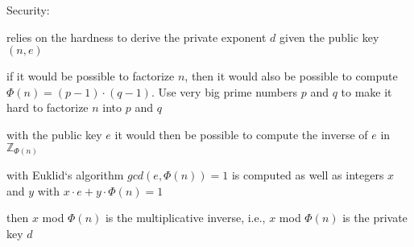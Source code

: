 \documentclass[landscape, a4paper]{article}
\begin{document}
\begin{minipage}[t]{0.198\pagewidth}
\begin{betterlist}
\begin{betterlist}
		\end{betterlist}
		\item \alert{Security:}
		\begin{betterlist}
			\item relies on the hardness to derive the \alert{private exponent} $d$ given the public key $(n, e)$
			\item if it would be possible to factorize $n$, then it would also be possible to compute $\Phi(n)= (p - 1) \cdot (q - 1)$. Use very big prime numbers $p$ and $q$ to make it hard to factorize $n$ into $p$ and $q$
			\item with the public key $e$ it would then be possible to compute the inverse of $e$ in $\mathbb{Z}_{\Phi(n)}$
			\begin{betterlist}
				\item with Euklid‘s algorithm $gcd(e, \Phi(n) ) = 1$ is computed as well as integers $x$ and $y$ with $x \cdot e + y \cdot \Phi(n) = 1$
				\item then $x$ mod $\Phi(n)$ is the multiplicative inverse, i.e., $x$ mod $\Phi(n)$ is the private key $d$
			\end{betterlist}
		\end{betterlist}
	\end{betterlist}
\end{minipage}
\end{document}
